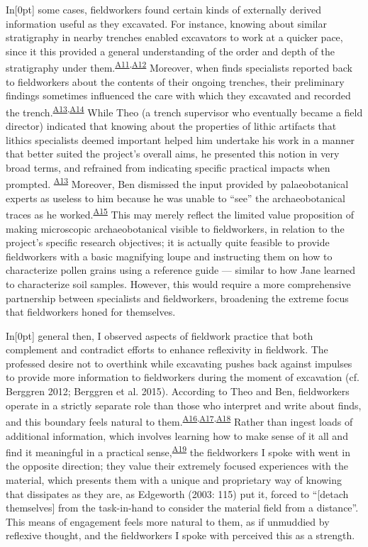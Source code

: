 \documentclass[
]{article}
\newcommand{\paragraphnumber}[1]{\marginnote{\color{lightgray}\tiny{#1}}[0pt]}
\begin{document}
In\paragraphnumber{[34]} some cases, fieldworkers found certain kinds of
externally derived information useful as they excavated. For instance,
knowing about similar stratigraphy in nearby trenches enabled excavators
to work at a quicker pace, since it this provided a general
understanding of the order and depth of the stratigraphy under
them.\textsuperscript{\hyperref[sec-A11]{A11},\hyperref[sec-A12]{A12}}
Moreover, when finds specialists reported back to fieldworkers about the
contents of their ongoing trenches, their preliminary findings sometimes
influenced the care with which they excavated and recorded the
trench.\textsuperscript{\hyperref[sec-A13]{A13},\hyperref[sec-A14]{A14}}
While Theo (a trench supervisor who eventually became a field director)
indicated that knowing about the properties of lithic artifacts that
lithics specialists deemed important helped him undertake his work in a
manner that better suited the project's overall aims, he presented this
notion in very broad terms, and refrained from indicating specific
practical impacts when prompted.
\textsuperscript{\hyperref[sec-A13]{A13}} Moreover, Ben dismissed the
input provided by palaeobotanical experts as useless to him because he
was unable to ``see'' the archaeobotanical traces as he
worked.\textsuperscript{\hyperref[sec-A15]{A15}} This may merely reflect
the limited value proposition of making microscopic archaeobotanical
visible to fieldworkers, in relation to the project's specific research
objectives; it is actually quite feasible to provide fieldworkers with a
basic magnifying loupe and instructing them on how to characterize
pollen grains using a reference guide --- similar to how Jane learned to
characterize soil samples. However, this would require a more
comprehensive partnership between specialists and fieldworkers,
broadening the extreme focus that fieldworkers honed for themselves.

In\paragraphnumber{[35]} general then, I observed aspects of fieldwork
practice that both complement and contradict efforts to enhance
reflexivity in fieldwork. The professed desire not to overthink while
excavating pushes back against impulses to provide more information to
fieldworkers during the moment of excavation (cf. Berggren 2012;
Berggren et al. 2015). According to Theo and Ben, fieldworkers operate
in a strictly separate role than those who interpret and write about
finds, and this boundary feels natural to
them.\textsuperscript{\hyperref[sec-A16]{A16},\hyperref[sec-A17]{A17},\hyperref[sec-A18]{A18}}
Rather than ingest loads of additional information, which involves
learning how to make sense of it all and find it meaningful in a
practical sense,\textsuperscript{\hyperref[sec-A19]{A19}} the
fieldworkers I spoke with went in the opposite direction; they value
their extremely focused experiences with the material, which presents
them with a unique and proprietary way of knowing that dissipates as
they are, as Edgeworth (2003: 115) put it, forced to ``{[}detach
themselves{]} from the task-in-hand to consider the material field from
a distance''. This means of engagement feels more natural to them, as if
unmuddied by reflexive thought, and the fieldworkers I spoke with
perceived this as a strength.
\end{document}
